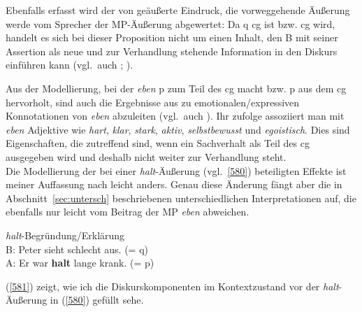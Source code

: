Ebenfalls erfasst wird der von \citet{Dahl1988} geäußerte Eindruck, die vorweggehende Äußerung werde vom Sprecher der MP-Äußerung abgewertet: Da q cg ist bzw. cg wird, handelt es sich bei dieser Proposition nicht um einen Inhalt, den B mit seiner Assertion als neue und zur Verhandlung stehende Information in den Diskurs einführen kann (vgl.\ auch \citealt[340--341]{Karagjosova2003}; \citeyear[208--209]{Karagjosova2004}).

Aus der Modellierung, bei der \textit{eben} p zum Teil des cg macht bzw. p aus dem cg hervorholt, sind auch die Ergebnisse aus \citet[185]{Hentschel1986} zu emotionalen/ex\-pressiven Konnotationen von \textit{eben} abzuleiten (vgl.\ auch \citealt[125, Fn 47]{Thurmair1989}). Ihr zufolge assoziiert man mit \textit{eben} Adjektive wie \textit{hart}, \textit{klar}, \textit{stark}, \textit{aktiv}, \textit{selbstbewusst} und \textit{egoistisch}. Dies sind Eigenschaften, die zutreffend sind, wenn ein Sachverhalt als Teil des cg ausgegeben wird und deshalb nicht weiter zur Verhandlung steht.\\

\noindent
Die Modellierung der bei einer \textit{halt}-Äußerung (vgl.\ \ref{580}) beteiligten Effekte ist meiner Auffassung nach leicht anders. Genau diese Änderung fängt aber die in Abschnitt~\ref{sec:untersch} beschriebenen unterschiedlichen Interpretationen auf, die ebenfalls nur leicht vom Beitrag der MP \textit{eben} abweichen.

\begin{exe}
	\ex\label{580} \textit{halt}-Begründung/Erklärung\\					
	B: Peter sieht schlecht aus. (= q)\\
	A: Er war \textbf{halt} lange krank. (= p)	
\end{exe}
(\ref{581}) zeigt, wie ich die Diskurskomponenten im Kontextzustand vor der \textit{halt}-Äuße\-rung in (\ref{580}) gefüllt sehe.


